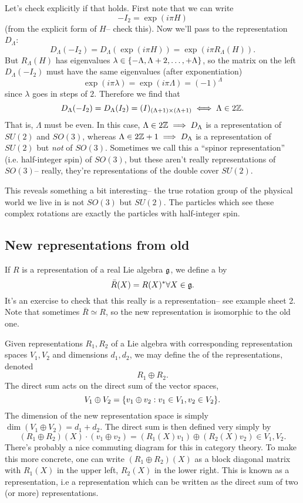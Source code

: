 Let's check explicitly if that holds. First note that we can write
$$-I_2 = \exp (i \pi H)$$
(from the explicit form of $H$-- check this). Now we'll pass to the representation $D_\Lambda$:
$$D_\Lambda(-I_2)=D_\Lambda(\exp(i\pi H)) = \exp(i\pi R_\Lambda(H)).$$
But $R_\Lambda(H)$ has eigenvalues $\lambda\in\{-\Lambda,\Lambda+2,\ldots,+\Lambda\}$, so the matrix on the left $D_\Lambda(-I_2)$ must have the same eigenvalues (after exponentiation) $$\exp(i\pi \lambda)= \exp(i\pi \Lambda)=(-1)^\Lambda$$ since $\lambda$ goes in steps of $2$.
Therefore we find that
$$D_\Lambda(-I_2)=D_\Lambda(I_2)=(I)_{(\Lambda+1)\times (\Lambda+1)}\iff \Lambda \in 2\mathbb{Z}.$$
That is, $\Lambda$ must be even. In this case,
$\Lambda \in 2 \mathbb{Z} \implies D_\Lambda$ is a representation of $SU(2)$ and $SO(3)$, whereas $\Lambda \in 2 \mathbb{Z}+1 \implies D_\Lambda$ is a representation of $SU(2)$ but \emph{not} of $SO(3)$. Sometimes we call this a ``spinor representation'' (i.e. half-integer spin) of $SO(3)$, but these aren't really representations of $SO(3)$-- really, they're representations of the double cover $SU(2)$.

This reveals something a bit interesting-- the true rotation group of the physical world we live in is not $SO(3)$ but $SU(2)$. The particles which see these complex rotations are exactly the particles with half-integer spin.

\subsection*{New representations from old} 
\begin{defn}
If $R$ is a representation of a real Lie algebra $\mathfrak{g}$, we define a  by
$$\bar R(X)=R(X)^* \forall X\in \mathfrak{g}.$$
It's an exercise to check that this really is a representation-- see example sheet 2. Note that sometimes $\bar R \simeq R$, so the new representation is isomorphic to the old one.
\end{defn}
\begin{defn}
Given representations $R_1,R_2$ of a Lie algebra with corresponding representation spaces $V_1,V_2$ and dimensions $d_1,d_2$, we may define the  of the representations, denoted
$$R_1 \oplus R_2.$$
The direct sum acts on the direct sum of the vector spaces, $$V_1 \oplus V_2 = \{v_1 \oplus v_2: v_1 \in V_1,
v_2 \in V_2\}.$$ The dimension of the new representation space is simply $\dim(V_1 \oplus V_2)=d_1 +d_2.$ The direct sum is then defined very simply by
$$(R_1 \oplus R_2)(X)\cdot (v_1 \oplus v_2)=(R_1(X)v_1)\oplus (R_2(X)v_2) \in V_1,V_2.$$
There's probably a nice commuting diagram for this in category theory. To make this more concrete, one can write $(R_1\oplus R_2)(X)$ as a block diagonal matrix with $R_1(X)$ in the upper left, $R_2(X)$ in the lower right. This is known as a  representation, i.e a representation which can be written as the direct sum of two (or more) representations.
\end{defn}

